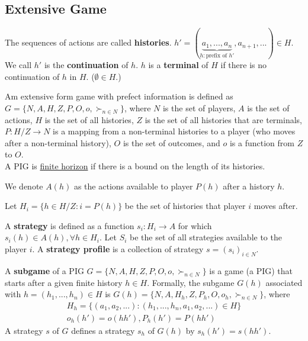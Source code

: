 \documentclass[11pt]{elegantbook}
\begin{document}
\subsection{Extensive Game}
\begin{definition}[History]
    \normalfont
    The sequences of actions are called \textbf{histories}. $h'=(\underbrace{a_1,...,a_n}_{h: \text{prefix of }h'},a_{n+1},...)\in H$. We call $h'$ is the \textbf{continuation} of $h$. $h$ is a \textbf{terminal} of $H$ if there is no continuation of $h$ in $H$. ($\emptyset\in H$.)
\end{definition}

\begin{definition}
    \normalfont
    Am extensive form game with prefect information is defined as $G=\{N,A,H,Z,P,O,o,\succ_{n\in N}\}$, where $N$ is the set of players, $A$ is the set of actions, $H$ is the set of all histories, $Z$ is the set of all histories that are terminals, $P:H/Z \rightarrow N$ is a mapping from a non-terminal histories to a player (who moves after a non-terminal history), $O$ is the set of outcomes, and $o$ is a function from $Z$ to $O$.\\
    A PIG is \underline{finite horizon} if there is a bound on the length of its histories.
\end{definition}


We denote $A(h)$ as the actions available to player $P(h)$ after a history $h$.

Let $H_i=\{h\in H/Z:i=P(h)\}$ be the set of histories that player $i$ moves after.

\begin{definition}[Strategy]
    \normalfont
    A \textbf{strategy} is defined as a function $s_i:H_i \rightarrow A$ for which $s_i(h)\in A(h),\forall h\in H_i$. Let $S_i$ be the set of all strategies available to the player $i$. A \textbf{strategy profile} is a collection of strategy $s=(s_i)_{i\in N}$.
\end{definition}



\begin{definition}[Subgame]
\normalfont
    A \textbf{subgame} of a PIG $G=\{N,A,H,Z,P,O,o,\succ_{n\in N}\}$ is a game (a PIG) that starts after a given finite history $h\in H$. Formally, the subgame $G(h)$ associated with $h=(h_1,...,h_n)\in H$ is $G(h)=\{N,A,H_h,Z,P_h,O,o_h,\succ_{n\in N}\}$, where
    \begin{equation}
        \begin{aligned}
            H_h=\{(a_1,a_2,...):(h_1,...,h_n,a_1,a_2,...)\in H\}\\
            o_h(h')=o(hh'), P_h(h')=P(hh')
        \end{aligned}
        \nonumber
    \end{equation}
    A strategy $s$ of $G$ defines a strategy $s_h$ of $G(h)$ by $s_h(h')=s(hh')$.
\end{definition}
\end{document}
